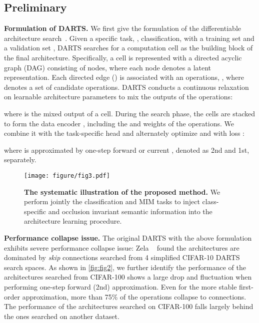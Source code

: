 \documentclass[10pt,twocolumn,letterpaper]{article}
\newcommand{\mypara}[1]{\vspace{1mm}\noindent\textbf{#1}}
\begin{document}
   \subsection{Preliminary}
\vspace{-4pt}
\label{sec:prel}
\mypara{Formulation of DARTS.}
We first give the formulation of the differentiable architecture search~\cite{liu2018darts}. Given a specific task, \eg, classification,
with a training set  
and a validation set , DARTS searches for a computation cell as the building block of the final architecture.
Specifically, a cell is represented with a directed acyclic graph (DAG) consisting of  nodes, where each node  denotes a latent representation. 
Each directed edge () is associated with an operations, , where  denotes a set of candidate operations.
DARTS conducts a continuous relaxation on learnable architecture parameters  to mix the outputs of the operations:
\vspace{-4pt}

where  is the mixed output of a cell.
During the search phase, the cells are stacked to form the data encoder , including the  and weights  of the operations. 
We combine it with the task-specific head  and alternately optimize  and  with loss :
\vspace{-4pt}

where  is approximated by one-step forward or current , denoted as 2nd and 1st, separately.
\begin{figure}[t]
    \centering
     \texttt{[image: figure/fig3.pdf]}
     \vspace{-6pt}
     \caption{\textbf{The systematic illustration of the proposed method.} We perform jointly the classification and MIM tasks to inject class-specific and occlusion invariant semantic information into the architecture learning procedure. }
     \label{fig:fig3}
     \vspace{-8pt}
  \end{figure}
   \mypara{Performance collapse issue.}
The original DARTS with the above formulation exhibits severe performance collapse issue: 
Zela \etal~\cite{Zela2020Understanding} found the architectures are dominated by \textit{skip} connections searched from 4 simplified CIFAR-10 DARTS search spaces.
As shown in \cref{fig:fig2}, we further identify the performance of the architectures searched from CIFAR-100 shows a large drop and fluctuation when performing one-step forward (2nd) approximation. 
Even for the more stable first-order approximation, more than 75\% of the operations collapse to  connections. 
The performance of the architectures searched on CIFAR-100 falls largely behind the ones searched on another dataset.
\end{document}
